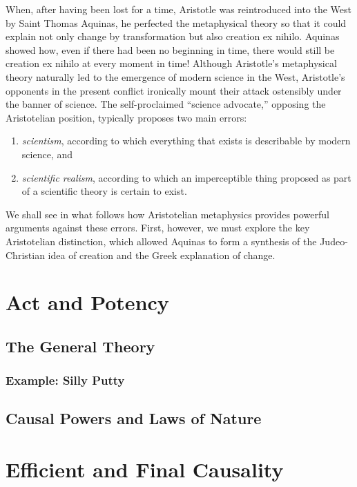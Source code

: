 \documentclass{article}
\begin{document}
When, after having been lost for a time, Aristotle was reintroduced into the
West by Saint Thomas Aquinas, he perfected the metaphysical theory so that it
could explain not only change by transformation but also creation ex nihilo.
Aquinas showed how, even if there had been no beginning in time, there would
still be creation ex nihilo at every moment in time!  Although Aristotle's
metaphysical theory naturally led to the emergence of modern science in the
West, Aristotle's opponents in the present conflict ironically mount their
attack ostensibly under the banner of science.  The self-proclaimed ``science
advocate,'' opposing the Aristotelian position, typically proposes two main
errors:
\begin{enumerate}
   \item \emph{scientism}, according to which everything that exists is
      describable by modern science, and
   \item \emph{scientific realism}, according to which an imperceptible thing
      proposed as part of a scientific theory is certain to exist.
\end{enumerate}
We shall see in what follows how Aristotelian metaphysics provides powerful
arguments against these errors.  First, however, we must explore the key
Aristotelian distinction, which allowed Aquinas to form a synthesis of the
Judeo-Christian idea of creation and the Greek explanation of change.

\section{Act and Potency}

\subsection{The General Theory}

\subsubsection{Example: Silly Putty}

\subsection{Causal Powers and Laws of Nature}

\section{Efficient and Final Causality}
\end{document}
